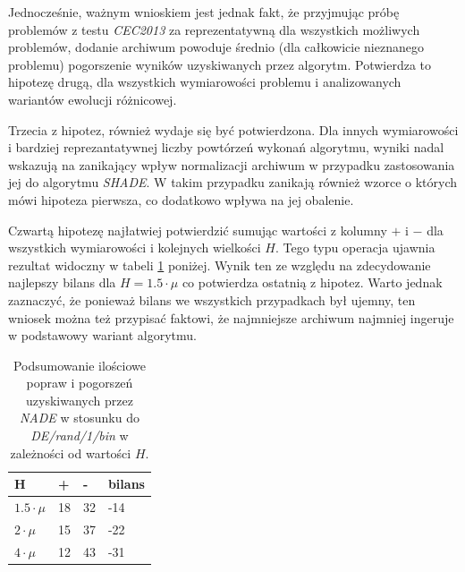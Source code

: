\documentclass[12pt,a4paper]{report}
\begin{document}
{{{{{{{\par{
Jednocześnie, ważnym wnioskiem jest jednak fakt, że przyjmując próbę problemów z testu \emph{CEC2013} za reprezentatywną dla wszystkich możliwych problemów, dodanie archiwum powoduje średnio (dla całkowicie nieznanego problemu) pogorszenie wyników uzyskiwanych przez algorytm. Potwierdza to hipotezę drugą, dla wszystkich wymiarowości problemu i analizowanych wariantów ewolucji różnicowej.
}
\par{
Trzecia z hipotez, również wydaje się być potwierdzona. Dla innych wymiarowości i bardziej reprezantatywnej liczby powtórzeń wykonań algorytmu, wyniki nadal wskazują na zanikający wpływ normalizacji archiwum w przypadku zastosowania jej do algorytmu \emph{SHADE}. W takim przypadku zanikają również wzorce o których mówi hipoteza pierwsza, co dodatkowo wpływa na jej obalenie.
}
\par{
Czwartą hipotezę najłatwiej potwierdzić sumując wartości z kolumny $+$ i $-$ dla wszystkich wymiarowości i kolejnych wielkości $H$. Tego typu operacja ujawnia rezultat widoczny w tabeli \ref{FULLSUMSUM} poniżej. Wynik ten ze względu na zdecydowanie najlepszy bilans dla $H = 1.5 \cdot \mu$ co potwierdza ostatnią z hipotez. Warto jednak zaznaczyć, że ponieważ bilans we wszystkich przypadkach był ujemny, ten wniosek można też przypisać faktowi, że najmniejsze archiwum najmniej ingeruje w podstawowy wariant algorytmu.
}

\begin{table}[h]
\centering
\caption{Podsumowanie ilościowe popraw i pogorszeń uzyskiwanych przez \emph{NADE} w stosunku do \emph{DE/rand/1/bin} w zależności od wartości $H$.}
\label{FULLSUMSUM}
\begin{tabular}{|l|l|l|l|}
\hline
{\bf H}               & {\bf +} & {\bf -} & {\bf bilans} \\ \hline
{\bf $1.5 \cdot \mu$} & 18       & 32       & -14            \\ \hline
{\bf $2 \cdot \mu$}   & 15       & 37       & -22            \\ \hline
{\bf $4 \cdot \mu$}   & 12       & 43       & -31            \\ \hline
\end{tabular}
\end{table}
}}}}}}}
\end{document}

